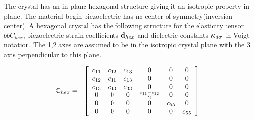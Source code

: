 The crystal has an in plane hexagonal structure giving
it an isotropic property in plane. The material begin piezoelectric
has no center of symmetry(inversion center). A hexagonal
crystal has the following structure for the elasticity tensor
$bbC_{hex}$, piezoelectric strain coefficients $\mathbf{d}_{hex}$ and
dielectric constants $\boldsymbol{\kappa}_{d\boldsymbol{\sigma}}$ in Voigt notation.
The 1,2 axes are assumed to be in the isotropic crystal
plane with the 3 axis perpendicular to this plane.


\begin{eqnarray}
\mathbb{C}_{hex} &=&
\left[
\begin{array}{cccccc}
c_{11}  & c_{12}  &  c_{13}  &   0   &   0    &  0    \\
c_{12}  & c_{11}  &  c_{13}  &   0   &   0    &  0    \\
c_{13}  & c_{13}  &  c_{33}  &   0   &   0    &  0    \\
    0   &     0   &      0   & \frac{c_{11}-c_{12}}{2} & 0 & 0 \\
    0   &     0   &      0   &   0   & c_{55} &  0    \\
    0   &     0   &      0   &   0   &   0    & c_{55}
\end{array}
\right] 
\end{eqnarray}

